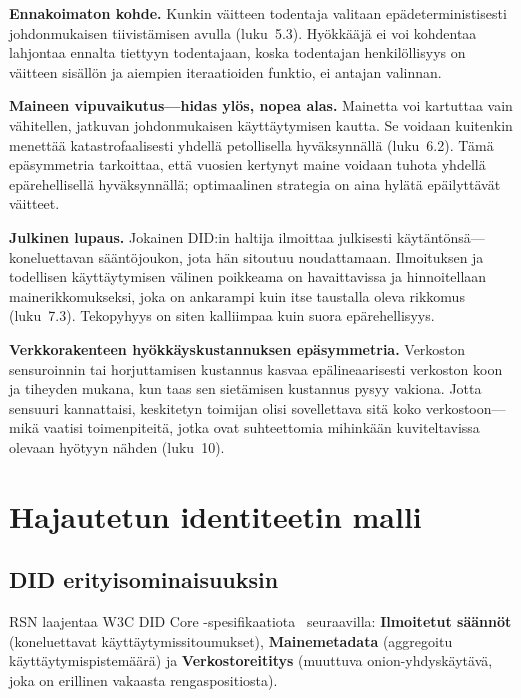 \documentclass[11pt,a4paper,twocolumn]{article}
\begin{document}
\textbf{Ennakoimaton kohde.} Kunkin väitteen todentaja valitaan epädeterministisesti johdonmukaisen tiivistämisen avulla (luku~5.3). Hyökkääjä ei voi kohdentaa lahjontaa ennalta tiettyyn todentajaan, koska todentajan henkilöllisyys on väitteen sisällön ja aiempien iteraatioiden funktio, ei antajan valinnan.

\textbf{Maineen vipuvaikutus---hidas ylös, nopea alas.} Mainetta voi kartuttaa vain vähitellen, jatkuvan johdonmukaisen käyttäytymisen kautta. Se voidaan kuitenkin menettää katastrofaalisesti yhdellä petollisella hyväksynnällä (luku~6.2). Tämä epäsymmetria tarkoittaa, että vuosien kertynyt maine voidaan tuhota yhdellä epärehellisellä hyväksynnällä; optimaalinen strategia on aina hylätä epäilyttävät väitteet.

\textbf{Julkinen lupaus.} Jokainen DID:in haltija ilmoittaa julkisesti käytäntönsä---koneluettavan sääntöjoukon, jota hän sitoutuu noudattamaan. Ilmoituksen ja todellisen käyttäytymisen välinen poikkeama on havaittavissa ja hinnoitellaan mainerikkomukseksi, joka on ankarampi kuin itse taustalla oleva rikkomus (luku~7.3). Tekopyhyys on siten kalliimpaa kuin suora epärehellisyys.

\textbf{Verkkorakenteen hyökkäyskustannuksen epäsymmetria.} Verkoston sensuroinnin tai horjuttamisen kustannus kasvaa epälineaarisesti verkoston koon ja tiheyden mukana, kun taas sen sietämisen kustannus pysyy vakiona. Jotta sensuuri kannattaisi, keskitetyn toimijan olisi sovellettava sitä koko verkostoon---mikä vaatisi toimenpiteitä, jotka ovat suhteettomia mihinkään kuviteltavissa olevaan hyötyyn nähden (luku~10).

\section{Hajautetun identiteetin malli}

\subsection{DID erityisominaisuuksin}

RSN laajentaa W3C DID Core -spesifikaatiota~\cite{did2022} seuraavilla: \textbf{Ilmoitetut säännöt} (koneluettavat käyttäytymissitoumukset), \textbf{Mainemetadata} (aggregoitu käyttäytymispistemäärä) ja \textbf{Verkostoreititys} (muuttuva onion-yhdyskäytävä, joka on erillinen vakaasta rengaspositiosta).
\end{document}
